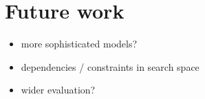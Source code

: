 \chapter{Future work}
\begin{itemize}
	\item more sophisticated models?
	\item dependencies / constraints in search space
	\item wider evaluation?
\end{itemize}